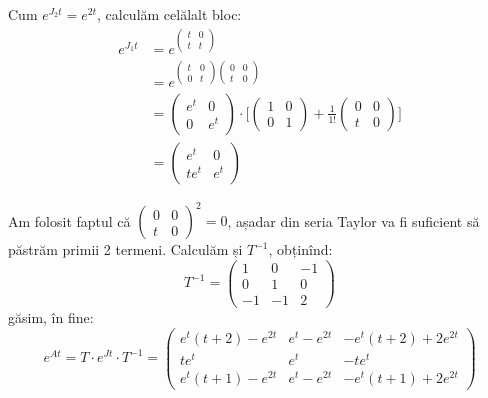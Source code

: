 Cum $e^{J_2 t} = e^{2t}$, calculăm celălalt bloc:
\begin{align*}
  e^{J_1 t} &= e^{\begin{pmatrix} t & 0 \\ t & t \end{pmatrix}} \\
            &= e^{\begin{pmatrix} t & 0 \\ 0 & t \end{pmatrix}
                                               \begin{pmatrix} 0 & 0 \\ t & 0 \end{pmatrix}} \\
            &= \begin{pmatrix} e^t & 0 \\ 0 & e^t \end{pmatrix} \cdot
                                              \Bigg[ \begin{pmatrix} 1 & 0 \\ 0 & 1 \end{pmatrix} +
                                                                                  \frac{1}{1!} \begin{pmatrix} 0 & 0 \\ t & 0 \end{pmatrix} \Bigg] \\
            &= \begin{pmatrix}
              e^t & 0 \\
              te^t & e^t 
            \end{pmatrix}
\end{align*}

Am folosit faptul că $\begin{pmatrix} 0 & 0 \\ t & 0 \end{pmatrix}^2 = 0$, așadar
din seria Taylor va fi suficient să păstrăm primii 2 termeni. Calculăm și $T^{-1}$,
obținînd:
\[
  T^{-1} = \begin{pmatrix}
    1 & 0 & -1 \\
    0 & 1 & 0 \\
    -1 & -1 & 2
  \end{pmatrix}
\]
găsim, în fine:
\[
  e^{At} = T \cdot e^{Jt} \cdot T^{-1} =
  \begin{pmatrix}
    e^t(t + 2) - e^{2t} & e^t - e^{2t} & -e^t(t + 2) + 2e^{2t} \\
    te^t & e^t & -te^t \\
    e^t(t + 1) - e^{2t} & e^t - e^{2t} & -e^t(t + 1) + 2e^{2t}
  \end{pmatrix}
\]

